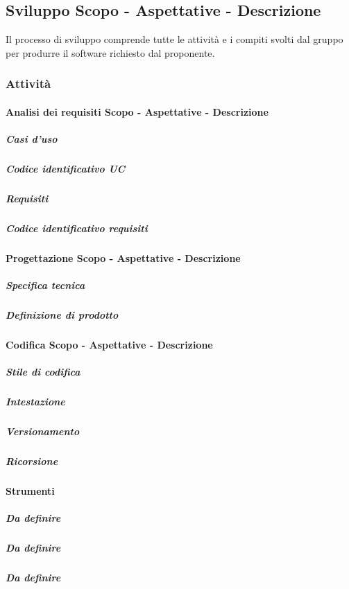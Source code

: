\subsection{Sviluppo Scopo - Aspettative - Descrizione}
Il processo di sviluppo comprende tutte le attività e i compiti svolti dal gruppo per produrre il software richiesto dal proponente.

\subsubsection{Attività}
\paragraph{Analisi dei requisiti Scopo - Aspettative - Descrizione}
\subparagraph{Casi d'uso}
\subparagraph{Codice identificativo UC}
\subparagraph{Requisiti}
\subparagraph{Codice identificativo requisiti}
\paragraph{Progettazione Scopo - Aspettative - Descrizione}
\subparagraph{Specifica tecnica}
\subparagraph{Definizione di prodotto}
\paragraph{Codifica Scopo - Aspettative - Descrizione}
\subparagraph{Stile di codifica}
\subparagraph{Intestazione}
\subparagraph{Versionamento}
\subparagraph{Ricorsione}
\paragraph{Strumenti}
\subparagraph{Da definire}
\subparagraph{Da definire}
\subparagraph{Da definire}



